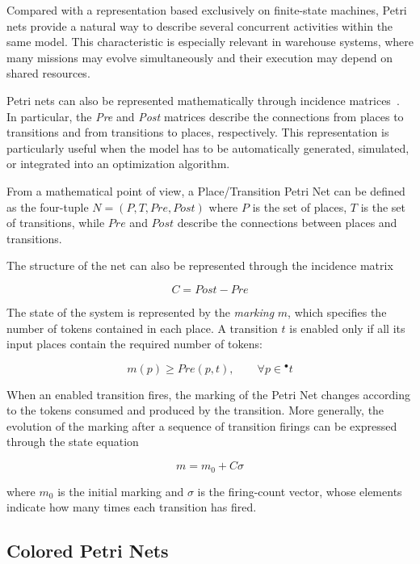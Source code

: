 \noindent Compared with a representation based exclusively on finite-state machines,
Petri nets provide a natural way to describe several concurrent activities within
the same model. This characteristic is especially relevant in warehouse systems,
where many missions may evolve simultaneously and their execution may depend on
shared resources.

Petri nets can also be represented mathematically through incidence
matrices~\cite{murata1989petri}.
In particular, the \textit{Pre} and \textit{Post} matrices describe the
connections from places to transitions and from transitions to places,
respectively. This representation is particularly useful when the model has to be
automatically generated, simulated, or integrated into an optimization algorithm.

From a mathematical point of view, a Place/Transition Petri Net can be defined
as the four-tuple $N = (P,T,Pre,Post)$ where $P$ is the set of places, $T$ is the set of transitions, while $Pre$ and $Post$ describe the connections between places and transitions.

The structure of the net can also be represented through the incidence matrix

\begin{equation}
	C = Post - Pre
\end{equation}

\noindent The state of the system is represented by the \textit{marking} $m$, which
specifies the number of tokens contained in each place. A transition $t$ is
enabled only if all its input places contain the required number of tokens:

\begin{equation}
	m(p) \geq Pre(p,t),
	\qquad \forall p \in {}^\bullet t
\end{equation}

\noindent When an enabled transition fires, the marking of the Petri Net changes according
to the tokens consumed and produced by the transition. More generally, the
evolution of the marking after a sequence of transition firings can be expressed
through the state equation

\begin{equation}
	m = m_0 + C\sigma
\end{equation}

\noindent where $m_0$ is the initial marking and $\sigma$ is the firing-count vector,
whose elements indicate how many times each transition has fired.

\subsection{Colored Petri Nets}

